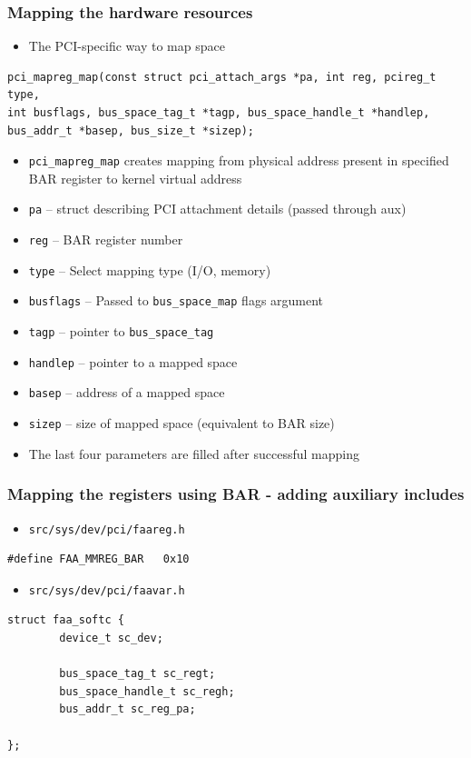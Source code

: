 \documentclass[dvipsnames,table]{beamer}
\begin{document}
\begin{frame}[fragile]
\frametitle{Mapping the hardware resources}

\begin{itemize}
	\item The PCI-specific way to map space
\end{itemize}
\scriptsize
\begin{verbatim}
pci_mapreg_map(const struct pci_attach_args *pa, int reg, pcireg_t type, 
int busflags, bus_space_tag_t *tagp, bus_space_handle_t *handlep, 
bus_addr_t *basep, bus_size_t *sizep);
\end{verbatim}
\normalsize
\begin{itemize}
	\item {\tt pci\_mapreg\_map} creates mapping from physical address present in specified BAR register to kernel virtual address
    \item {\tt pa} -- struct describing PCI attachment details (passed through aux)
    \item {\tt reg} -- BAR register number
   	\item {\tt type} -- Select mapping type (I/O, memory)
	\item {\tt busflags} -- Passed to {\tt bus\_space\_map} flags argument
	\item {\tt tagp} -- pointer to {\tt bus\_space\_tag}
	\item {\tt handlep} -- pointer to a mapped space
	\item {\tt basep} -- address of a mapped space
	\item {\tt sizep} -- size of mapped space (equivalent to BAR size)
	\item The last four parameters are filled after successful mapping
\end{itemize}
\end{frame}

\begin{frame}[fragile]
\frametitle{Mapping the registers using BAR - adding auxiliary includes}
\scriptsize
\begin{itemize}
	\item {\tt src/sys/dev/pci/faareg.h}
\end{itemize}
\begin{verbatim}
#define FAA_MMREG_BAR   0x10
\end{verbatim}
\begin{itemize}
	\item {\tt src/sys/dev/pci/faavar.h}
\end{itemize}
\begin{verbatim}
struct faa_softc {
        device_t sc_dev;

        bus_space_tag_t sc_regt;
        bus_space_handle_t sc_regh;
        bus_addr_t sc_reg_pa;

};
\end{verbatim}
\end{frame}
\end{document}
